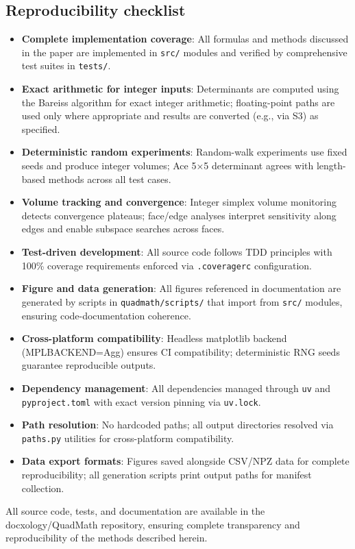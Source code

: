 \documentclass[
  10pt,
]{article}
\newcommand{\passthrough}[1]{#1}
\providecommand{\tightlist}{%
  \setlength{\itemsep}{0pt}\setlength{\parskip}{0pt}}
\begin{document}
\hypertarget{reproducibility-checklist}{%
\subsection{Reproducibility checklist}\label{reproducibility-checklist}}

\begin{itemize}
\tightlist
\item
  \textbf{Complete implementation coverage}: All formulas and methods
  discussed in the paper are implemented in
  \passthrough{\lstinline!src/!} modules and verified by comprehensive
  test suites in \passthrough{\lstinline!tests/!}.
\item
  \textbf{Exact arithmetic for integer inputs}: Determinants are
  computed using the Bareiss algorithm for exact integer arithmetic;
  floating-point paths are used only where appropriate and results are
  converted (e.g., via S3) as specified.
\item
  \textbf{Deterministic random experiments}: Random-walk experiments use
  fixed seeds and produce integer volumes; Ace 5×5 determinant agrees
  with length-based methods across all test cases.
\item
  \textbf{Volume tracking and convergence}: Integer simplex volume
  monitoring detects convergence plateaus; face/edge analyses interpret
  sensitivity along edges and enable subspace searches across faces.
\item
  \textbf{Test-driven development}: All source code follows TDD
  principles with 100\% coverage requirements enforced via
  \passthrough{\lstinline!.coveragerc!} configuration.
\item
  \textbf{Figure and data generation}: All figures referenced in
  documentation are generated by scripts in
  \passthrough{\lstinline!quadmath/scripts/!} that import from
  \passthrough{\lstinline!src/!} modules, ensuring code-documentation
  coherence.
\item
  \textbf{Cross-platform compatibility}: Headless matplotlib backend
  (MPLBACKEND=Agg) ensures CI compatibility; deterministic RNG seeds
  guarantee reproducible outputs.
\item
  \textbf{Dependency management}: All dependencies managed through
  \passthrough{\lstinline!uv!} and
  \passthrough{\lstinline!pyproject.toml!} with exact version pinning
  via \passthrough{\lstinline!uv.lock!}.
\item
  \textbf{Path resolution}: No hardcoded paths; all output directories
  resolved via \passthrough{\lstinline!paths.py!} utilities for
  cross-platform compatibility.
\item
  \textbf{Data export formats}: Figures saved alongside CSV/NPZ data for
  complete reproducibility; all generation scripts print output paths
  for manifest collection.
\end{itemize}

All source code, tests, and documentation are available in the
docxology/QuadMath repository, ensuring complete transparency and
reproducibility of the methods described herein.
\end{document}
